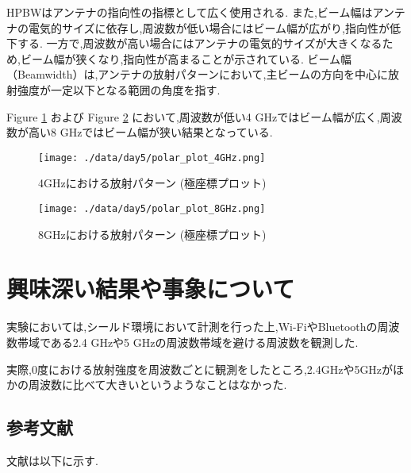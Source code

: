 \documentclass[a4paper, twocolumn]{article} %
\begin{document}
HPBWはアンテナの指向性の指標として広く使用される. また,ビーム幅はアンテナの電気的サイズに依存し,周波数が低い場合にはビーム幅が広がり,指向性が低下する. 一方で,周波数が高い場合にはアンテナの電気的サイズが大きくなるため,ビーム幅が狭くなり,指向性が高まることが示されている.
ビーム幅（Beamwidth）は,アンテナの放射パターンにおいて,主ビームの方向を中心に放射強度が一定以下となる範囲の角度を指す. 



Figure \ref{fig:polar_4GHz} および Figure \ref{fig:polar_8GHz} において,周波数が低い4 GHzではビーム幅が広く,周波数が高い8 GHzではビーム幅が狭い結果となっている.


\begin{figure}[h]
    \centering
    \texttt{[image: ./data/day5/polar\_plot\_4GHz.png]}
    \caption{4GHzにおける放射パターン (極座標プロット)}
    \label{fig:polar_4GHz}
\end{figure}

\begin{figure}[h]
    \centering
    \texttt{[image: ./data/day5/polar\_plot\_8GHz.png]}
    \caption{8GHzにおける放射パターン (極座標プロット)}
    \label{fig:polar_8GHz}
\end{figure}

\section{興味深い結果や事象について}
実験においては,シールド環境において計測を行った上,Wi-FiやBluetoothの周波数帯域である2.4 GHzや5 GHzの周波数帯域を避ける周波数を観測した.

実際,0度における放射強度を周波数ごとに観測をしたところ,2.4GHzや5GHzがほかの周波数に比べて大きいというようなことはなかった.


\subsection{参考文献}
文献は以下に示す.
\end{document}

